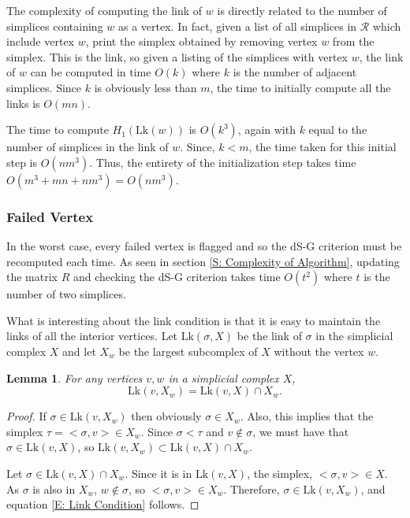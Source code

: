 \documentclass[10pt,twocolumn]{article} \usepackage{amsmath,epsf,amssymb,cite,pifont,amsthm, mathrsfs,epsfig,  bbm, amsthm,  setspace}
\newtheorem{lemma}{Lemma}
\newcommand{\RR}{\mathcal R}
\renewcommand{\1}{\mathbbm{1}}
\newcommand{\Lk}{\textrm{Lk}}
\begin{document}
The complexity of computing the link of $w$ is directly related to the number of simplices containing $w$ as a vertex.
In fact, given a list of all simplices in $\RR$ which include vertex $w$, print the simplex obtained by removing vertex $w$ from the simplex.
This is the link, so given a listing of the simplices with vertex $w$, the link of $w$ can be computed in time $O(k)$ where $k$ is the number of adjacent simplices.
Since $k$ is obviously less than $m$, the time to initially compute all the links is $O(mn)$.

The time to compute $H_1(\Lk(w))$ is $O(k^3)$, again with $k$ equal to the number of simplices in the link of $w$.  Since, $k<m$, the time taken for this initial step is $O(nm^3)$.
Thus, the entirety of the initialization step takes time $O(m^3+mn+nm^3) = O(nm^3)$.

\subsubsection*{Failed Vertex}

In the worst case, every failed vertex is flagged and so the dS-G criterion must be recomputed each time.
As seen in section \ref{S: Complexity of Algorithm}, updating the matrix $R$ and checking the dS-G criterion takes time $O(t^2)$ where $t$ is the number of two simplices.


What is interesting about the link condition is that it is easy to maintain the links of all the interior vertices.
  Let $\Lk(\sigma,X)$ be the link of $\sigma$ in the simplicial complex $X$ and let $X_w$ be the largest subcomplex of $X$ without the vertex $w$.

\begin{lemma}
For any vertices $v,w$ in a simplicial complex $X$,
\begin{equation}\label{E: Link Condition}
 \Lk(v,X_w) = \Lk(v,X) \cap X_w.
\end{equation}
\end{lemma}
\begin{proof}
 If $\sigma \in \Lk(v,X_w)$ then obviously $\sigma \in X_w$.
 Also, this implies that the simplex $\tau = <\sigma,v> \in X_w$.
 Since $\sigma< \tau$ and $v \not \in \sigma$, we must have that $\sigma \in \Lk(v,X)$, so $\Lk(v,X_w) \subset \Lk(v,X) \cap X_w$.

 Let $\sigma \in \Lk(v,X) \cap X_w$. Since it is in $\Lk(v,X)$, the simplex, $<\sigma,v> \in X$.
 As $\sigma$ is also in $X_w$, $w \not \in \sigma$, so $<\sigma,v> \in X_w$.  Therefore, $\sigma \in \Lk(v,X_w)$, and equation \ref{E: Link Condition} follows.
\end{proof}
\end{document}
